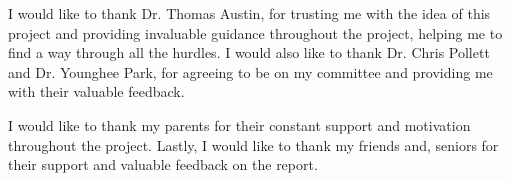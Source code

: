 I would like to thank Dr. Thomas Austin, for trusting me with the idea of this project and providing invaluable guidance throughout the project, helping me to find a way through all the hurdles. I would also like to thank Dr. Chris Pollett and Dr. Younghee Park, for agreeing to be on my committee and providing me with their valuable feedback.

I would like to thank my parents for their constant support and motivation throughout the project. Lastly, I would like to thank my friends and, seniors for their support and valuable feedback on the report.   

